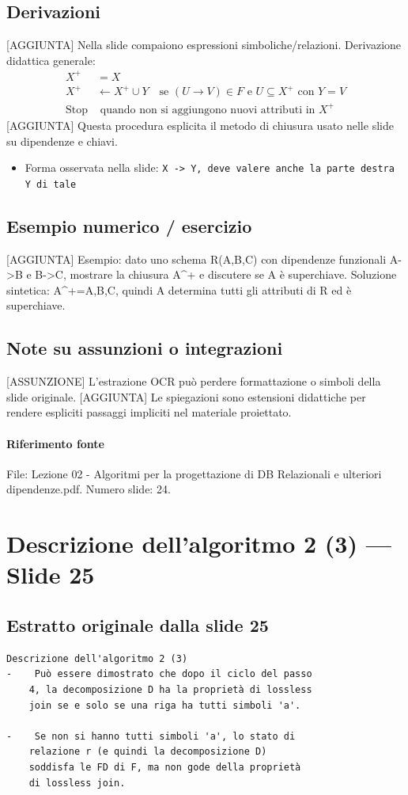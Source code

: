 \documentclass[11pt]{article}
\begin{document}
\subsection*{Derivazioni}
[AGGIUNTA] Nella slide compaiono espressioni simboliche/relazioni. Derivazione didattica generale:
\begin{align*}
X^+ &= X \\
X^+ &\leftarrow X^+ \cup Y \quad \text{se } (U \to V) \in F \text{ e } U \subseteq X^+ \text{ con } Y=V \\
\text{Stop} &\text{ quando non si aggiungono nuovi attributi in } X^+
\end{align*}
[AGGIUNTA] Questa procedura esplicita il metodo di chiusura usato nelle slide su dipendenze e chiavi.
\begin{itemize}[leftmargin=*]
\item Forma osservata nella slide: \texttt{X -> Y, deve valere anche la parte destra Y di tale}
\end{itemize}
\subsection*{Esempio numerico / esercizio}
[AGGIUNTA] Esempio: dato uno schema R(A,B,C) con dipendenze funzionali A->B e B->C, mostrare la chiusura A^+ e discutere se A è superchiave. Soluzione sintetica: A^+={A,B,C}, quindi A determina tutti gli attributi di R ed è superchiave.
\subsection*{Note su assunzioni o integrazioni}
[ASSUNZIONE] L'estrazione OCR può perdere formattazione o simboli della slide originale.
[AGGIUNTA] Le spiegazioni sono estensioni didattiche per rendere espliciti passaggi impliciti nel materiale proiettato.
\paragraph{Riferimento fonte} File: Lezione 02 - Algoritmi per la progettazione di DB Relazionali e ulteriori dipendenze.pdf. Numero slide: 24.
\section{Descrizione dell'algoritmo 2 (3) --- Slide 25}
\subsection*{Estratto originale dalla slide 25}
\begin{lstlisting}
Descrizione dell'algoritmo 2 (3)
-    Può essere dimostrato che dopo il ciclo del passo
    4, la decomposizione D ha la proprietà di lossless
    join se e solo se una riga ha tutti simboli 'a'.

-    Se non si hanno tutti simboli 'a', lo stato di
    relazione r (e quindi la decomposizione D)
    soddisfa le FD di F, ma non gode della proprietà
    di lossless join.
\end{lstlisting}
\end{document}
